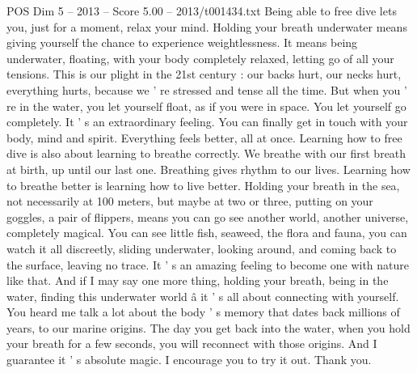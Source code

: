 \begin{textsample}{POS Dim 5 – 2013 – Score 5.00 – 2013/t001434.txt}
Being able to free dive lets you, just for a moment, relax your mind.
Holding your breath underwater means giving yourself the chance to experience weightlessness.
It means being underwater, floating, with your body completely relaxed, letting go of all your tensions.
This is our plight in the 21st century : our backs hurt, our necks hurt, everything hurts, because we ' re stressed and tense all the time.
But when you ' re in the water, you let yourself float, as if you were in space.
You let yourself go completely.
It ' s an extraordinary feeling.
You can finally get in touch with your body, mind and spirit.
Everything feels better, all at once.
Learning how to free dive is also about learning to breathe correctly.
We breathe with our first breath at birth, up until our last one.
Breathing gives rhythm to our lives.
Learning how to breathe better is learning how to live better.
Holding your breath in the sea, not necessarily at 100 meters, but maybe at two or three, putting on your goggles, a pair of flippers, means you can go see another world, another universe, completely magical.
You can see little fish, seaweed, the flora and fauna, you can watch it all discreetly, sliding underwater, looking around, and coming back to the surface, leaving no trace.
It ' s an amazing feeling to become one with nature like that.
And if I may say one more thing, holding your breath, being in the water, finding this underwater world â it ' s all about connecting with yourself.
You heard me talk a lot about the body ' s memory that dates back millions of years, to our marine origins.
The day you get back into the water, when you hold your breath for a few seconds, you will reconnect with those origins.
And I guarantee it ' s absolute magic.
I encourage you to try it out.
Thank you.

\end{textsample}

